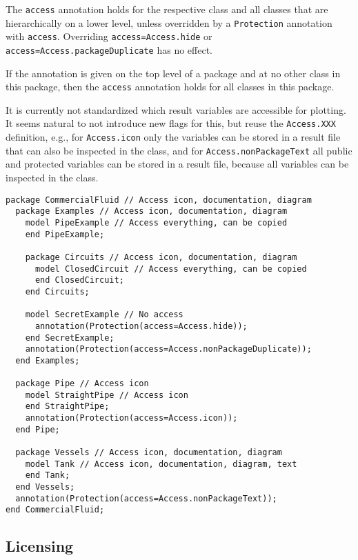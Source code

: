The \lstinline!access! annotation holds for the respective class and all classes
that are hierarchically on a lower level, unless overridden by a
\lstinline!Protection! annotation with \lstinline!access!.
Overriding \lstinline!access=Access.hide! or \lstinline!access=Access.packageDuplicate!
has no effect.

\begin{example}
If the annotation is given on the top level of a package and at no other class in this
package, then the \lstinline!access! annotation holds for all classes in this package.
\end{example}

\begin{nonnormative}
It is currently not standardized which result variables are
accessible for plotting. It seems natural to not introduce new flags for
this, but reuse the \lstinline!Access.XXX! definition, e.g., for \lstinline!Access.icon!
only the variables can be stored in a result file that can also be
inspected in the class, and for \lstinline!Access.nonPackageText! all public
and protected variables can be stored in a result file, because all
variables can be inspected in the class.

\begin{lstlisting}[language=modelica]
package CommercialFluid // Access icon, documentation, diagram
  package Examples // Access icon, documentation, diagram
    model PipeExample // Access everything, can be copied
    end PipeExample;

    package Circuits // Access icon, documentation, diagram
      model ClosedCircuit // Access everything, can be copied
      end ClosedCircuit;
    end Circuits;

    model SecretExample // No access
      annotation(Protection(access=Access.hide));
    end SecretExample;
    annotation(Protection(access=Access.nonPackageDuplicate));
  end Examples;

  package Pipe // Access icon
    model StraightPipe // Access icon
    end StraightPipe;
    annotation(Protection(access=Access.icon));
  end Pipe;

  package Vessels // Access icon, documentation, diagram
    model Tank // Access icon, documentation, diagram, text
    end Tank;
  end Vessels;
  annotation(Protection(access=Access.nonPackageText));
end CommercialFluid;
\end{lstlisting}
\end{nonnormative}

\subsection{Licensing}\label{licensing}

